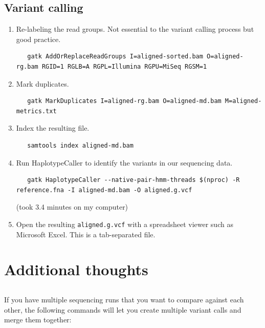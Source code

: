 \documentclass[12pt,letterpaper]{article}
\begin{document}
\subsection{Variant calling}

\begin{enumerate}
   \item Re-labeling the read groups. Not essential to the variant calling process but good practice.  \begin{verbatim}
   gatk AddOrReplaceReadGroups I=aligned-sorted.bam O=aligned-rg.bam RGID=1 RGLB=A RGPL=Illumina RGPU=MiSeq RGSM=1
   \end{verbatim}
   \item Mark duplicates. \begin{verbatim}
   gatk MarkDuplicates I=aligned-rg.bam O=aligned-md.bam M=aligned-metrics.txt
   \end{verbatim}
   \item Index the resulting file. \begin{verbatim}
   samtools index aligned-md.bam
   \end{verbatim}
   \item Run HaplotypeCaller to identify the variants in our sequencing data. \begin{verbatim}
   gatk HaplotypeCaller --native-pair-hmm-threads $(nproc) -R reference.fna -I aligned-md.bam -O aligned.g.vcf
   \end{verbatim}
   (took 3.4 minutes on my computer)
   \item Open the resulting \texttt{aligned.g.vcf} with a spreadsheet viewer such as Microsoft Excel. This is a tab-separated file.
\end{enumerate}

\section{Additional thoughts}

\subsection{}

If you have multiple sequencing runs that you want to compare against each other, the following commands will let you create multiple variant calls and merge them together:
\end{document}

